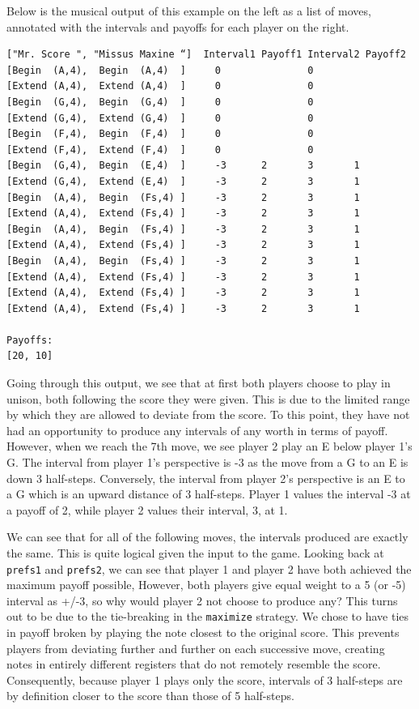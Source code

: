 \documentclass{article}
\begin{document}
Below is the musical output of this example on the left as a list of
moves, annotated with the intervals and payoffs for each player on the
right.

\begin{verbatim}
["Mr. Score ", "Missus Maxine “]  Interval1 Payoff1 Interval2 Payoff2
[Begin  (A,4),  Begin  (A,4)  ]     0               0        
[Extend (A,4),  Extend (A,4)  ]     0               0        
[Begin  (G,4),  Begin  (G,4)  ]     0               0        
[Extend (G,4),  Extend (G,4)  ]     0               0        
[Begin  (F,4),  Begin  (F,4)  ]     0               0        
[Extend (F,4),  Extend (F,4)  ]     0               0        
[Begin  (G,4),  Begin  (E,4)  ]     -3      2       3       1
[Extend (G,4),  Extend (E,4)  ]     -3      2       3       1
[Begin  (A,4),  Begin  (Fs,4) ]     -3      2       3       1
[Extend (A,4),  Extend (Fs,4) ]     -3      2       3       1
[Begin  (A,4),  Begin  (Fs,4) ]     -3      2       3       1
[Extend (A,4),  Extend (Fs,4) ]     -3      2       3       1
[Begin  (A,4),  Begin  (Fs,4) ]     -3      2       3       1
[Extend (A,4),  Extend (Fs,4) ]     -3      2       3       1
[Extend (A,4),  Extend (Fs,4) ]     -3      2       3       1
[Extend (A,4),  Extend (Fs,4) ]     -3      2       3       1

Payoffs:
[20, 10]
\end{verbatim}

Going through this output, we see that at first both players choose to
play in unison, both following the score they were given. This is due to
the limited range by which they are allowed to deviate from the score.
To this point, they have not had an opportunity to produce any intervals
of any worth in terms of payoff. However, when we reach the 7th move, we
see player 2 play an E below player 1's G. The interval from player 1's 
perspective is -3 as the move from a G to an E is down 3 half-steps. 
Conversely, the interval from player 2's perspective is an E to a G which is 
an upward distance of 3 half-steps.  Player 1 values the interval -3 at a 
payoff of 2, while player 2 values their interval, 3, at 1.

We can see that for all of the following moves, the intervals produced
are exactly the same. This is quite logical given the input to the game.
Looking back at \texttt{prefs1} and \texttt{prefs2}, we can see that player 1 and player 2
have both achieved the maximum payoff possible,
However, both players give equal weight to a 5 (or -5) interval as +/-3,
so why would player 2 not choose to produce any? This turns out to be due
to the tie-breaking in the \texttt{maximize} strategy. We chose to have ties in
payoff broken by playing the note closest to the original score. This
prevents players from deviating further and further on each successive move,
creating notes in entirely different registers that do not remotely
resemble the score. Consequently, because player 1 plays only the score,
intervals of 3 half-steps are by definition closer to the score than
those of 5 half-steps.
\end{document}

